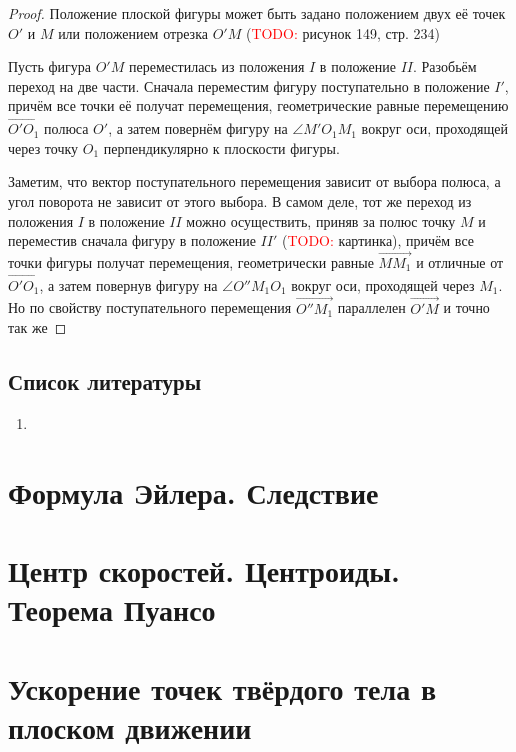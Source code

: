 \documentclass{article}
\theoremstyle{definition}
\theoremstyle{plain}
\theoremstyle{remark}
\numberwithin{equation}{section}
\newcommand{\vv}[1]{\overrightarrow{#1}}
\begin{document}
\begin{proof}
  Положение плоской фигуры может быть задано положением двух её точек $O'$ и
  $M$ или положением отрезка $O'M$
  (\textcolor{red}{TODO:} рисунок 149, стр. 234)

  Пусть фигура $O'M$ переместилась из положения $I$ в положение $II$. Разобьём
  переход на две части. Сначала переместим фигуру поступательно в положение
  $I'$, причём все точки её получат перемещения, геометрические равные
  перемещению $\vv{O'O_1}$ полюса $O'$, а затем повернём фигуру на $\angle M'O_1
  M_1$ вокруг оси, проходящей через точку $O_1$ перпендикулярно к плоскости
  фигуры.

  Заметим, что вектор поступательного перемещения зависит от выбора полюса, а
  угол поворота не зависит от этого выбора. В самом деле, тот же переход из
  положения $I$ в положение $II$ можно осуществить, приняв за полюс точку $M$ и
  переместив сначала фигуру в положение $II'$ (\textcolor{red}{TODO:} картинка),
  причём все точки фигуры получат перемещения, геометрически равные
  $\vv{M M_1}$ и отличные от $\vv{O' O_1}$, а затем повернув фигуру на
  $\angle O'' M_1 O_1$ вокруг оси, проходящей через $M_1$. Но по свойству
  поступательного перемещения $\vv{O'' M_1}$ параллелен $\vv{O' M}$ и точно так
  же 
\end{proof}

\subsection{Список литературы}
\begin{enumerate}
  \item \cite{lourie}
\end{enumerate}

\pagebreak


\section{Формула Эйлера. Следствие}
\pagebreak

\section{Центр скоростей. Центроиды. Теорема Пуансо}
\pagebreak

\section{Ускорение точек твёрдого тела в плоском движении}
\pagebreak
\end{document}
